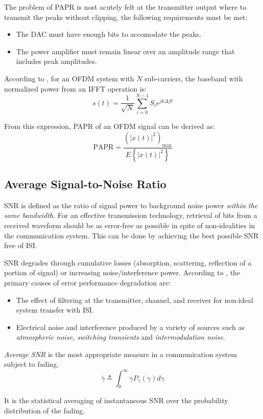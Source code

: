 The problem of \gls{PAPR} is nost acutely felt at the transmitter output where to transmit the peaks without clipping, the following requirements must be met\cite{ofdm_intro}:
\begin{itemize}
	\item The \gls{DAC} must have enough bits to accomodate the peaks.
	\item The power amplifier must remain linear over an amplitude range that includes peak amplitudes.
\end{itemize}
According to \cite{papr_paper}, for an OFDM system with \(N\) sub-carriers, the baseband with normalized power from an IFFT operation is:
\[
	s(t) = \frac{1}{\sqrt{N}} \sum_{i=0}^{N-1} S_i e^{jk\Delta ft}
\]
\begin{mathDef}
\end{mathDef}
From this expression, \gls{PAPR} of an OFDM signal can be derived as:
\[
	\text{PAPR} = \frac{\left( |x(t)|^2 \right)_\text{max}}{E\left\{ |x(t)|^2 \right\}}
\]
\begin{mathDef}
\end{mathDef}

\subsection{Average Signal-to-Noise Ratio}
\gls{SNR} is defined as the ratio of signal power to background noise power \emph{within the same bandwidth}\cite{dcommoha}.
For an effective transmission technology, retrieval of bits from a received waveform should be as error-free as possible in spite of non-idealities in the communication system. This can be done by achieving the best possible \gls{SNR} free of \gls{ISI}.

SNR degrades through cumulative losses (absorption, scattering, reflection of a portion of signal) or increasing noise/interference power. 
According to \cite{AWGN}, the primary causes of error performance degradation are:
\begin{itemize}
	\item The effect of filtering at the transmitter, channel, and receiver for non-ideal system transfer with \gls{ISI}.
\item Electrical noise and interference produced by a variety of sources such as \emph{atmospheric noise, switching transients} and \emph{intermodulation noise}.
\end{itemize}
\emph{Average \gls{SNR}} is the most appropriate measure in a communication system subject to fading.
\[
	\bar{\gamma} \triangleq \int_0^\infty \gamma P_\gamma (\gamma) d\gamma
\]
\begin{mathDef}
\end{mathDef}
It is the statistical averaging of instantaneous SNR over the probability distribution of the fading.

